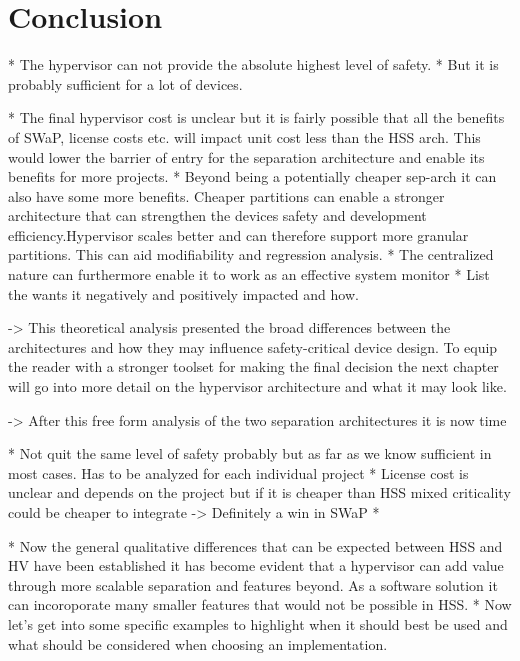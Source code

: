 
\section{Conclusion}
* The hypervisor can not provide the absolute highest level of safety.
* But it is probably sufficient for a lot of devices.

* The final hypervisor cost is unclear but it is fairly possible that all the benefits of SWaP, license costs etc. will impact unit cost less than the HSS arch. This would lower the barrier of entry for the separation architecture and enable its benefits for more projects.
* Beyond being a potentially cheaper sep-arch it can also have some more benefits. Cheaper partitions can enable a stronger architecture that can strengthen the devices safety and development efficiency.Hypervisor scales better and can therefore support more granular partitions. This can aid modifiability and regression analysis.
* The centralized nature can furthermore enable it to work as an effective system monitor
* List the wants it negatively and positively impacted and how.

-> This theoretical analysis presented the broad differences between the architectures and how they may influence safety-critical device design. To equip the reader with a stronger toolset for making the final decision the next chapter will go into more detail on the hypervisor architecture and what it may look like.

-> After this free form analysis of the two separation architectures it is now time


* Not quit the same level of safety probably but as far as we know sufficient in most cases. Has to be analyzed for each individual project
* License cost is unclear and depends on the project but if it is cheaper than HSS mixed criticality could be cheaper to integrate
-> Definitely a win in SWaP
* 

* Now the general qualitative differences that can be expected between HSS and HV have been established it has become evident that a hypervisor can add value through more scalable separation and features beyond. As a software solution it can incoroporate many smaller features that would not be possible in HSS.
* Now let's get into some specific examples to highlight when it should best be used and what should be considered when choosing an implementation.
